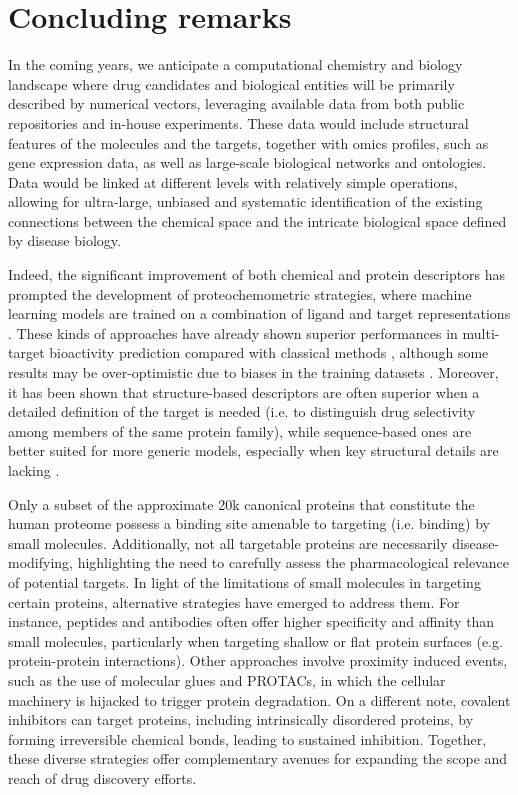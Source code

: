 \chapter{Concluding remarks}
\label{concluding}
\clearpage

In the coming years, we anticipate a computational chemistry and biology landscape where drug candidates and biological entities will be primarily described by numerical vectors, leveraging available data from both public repositories and in-house experiments. These data would include structural features of the molecules and the targets, together with omics profiles, such as gene expression data, as well as large-scale biological networks and ontologies. Data would be linked at different levels with relatively simple operations, allowing for ultra-large, unbiased and systematic identification of the existing connections between the chemical space and the intricate biological space defined by disease biology. 

Indeed, the significant improvement of both chemical and protein descriptors has prompted the development of proteochemometric strategies, where machine learning models are trained on a combination of ligand and target representations \cite{bongers_proteochemometrics_2019}. These kinds of approaches have already shown superior performances in multi-target bioactivity prediction compared with classical methods \cite{torng_graph_2019}, although some results may be over-optimistic due to biases in the training datasets \cite{chen_hidden_2019}. Moreover, it has been shown that structure-based descriptors are often superior when a detailed definition of the target is needed (i.e. to distinguish drug selectivity among members of the same protein family), while sequence-based ones are better suited for more generic models, especially when key structural details are lacking \cite{bongers_proteochemometrics_2019}.

Only a subset of the approximate 20k canonical proteins that constitute the human proteome possess a binding site amenable to targeting (i.e. binding) by small molecules. Additionally, not all targetable proteins are necessarily disease-modifying, highlighting the need to carefully assess the pharmacological relevance of potential targets. In light of the limitations of small molecules in targeting certain proteins, alternative strategies have emerged to address them. For instance, peptides and antibodies often offer higher specificity and affinity than small molecules, particularly when targeting shallow or flat protein surfaces (e.g. protein-protein interactions). Other approaches involve proximity induced events, such as the use of molecular glues and PROTACs, in which the cellular machinery is hijacked to trigger protein degradation. On a different note, covalent inhibitors can target proteins, including intrinsically disordered proteins, by forming irreversible chemical bonds, leading to sustained inhibition. Together, these diverse strategies offer complementary avenues for expanding the scope and reach of drug discovery efforts. 

